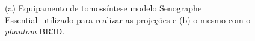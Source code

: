 
\begin{figure}[H]
	\centering
	
	\caption{(a) Equipamento de tomossíntese modelo Senographe Essential\texttrademark \ utilizado para realizar as projeções e (b) o mesmo com o \textit{phantom} BR3D.}
	
	\hfil
	
	\label{fig:imgCap4EquipamentoGE}
\end{figure} 


